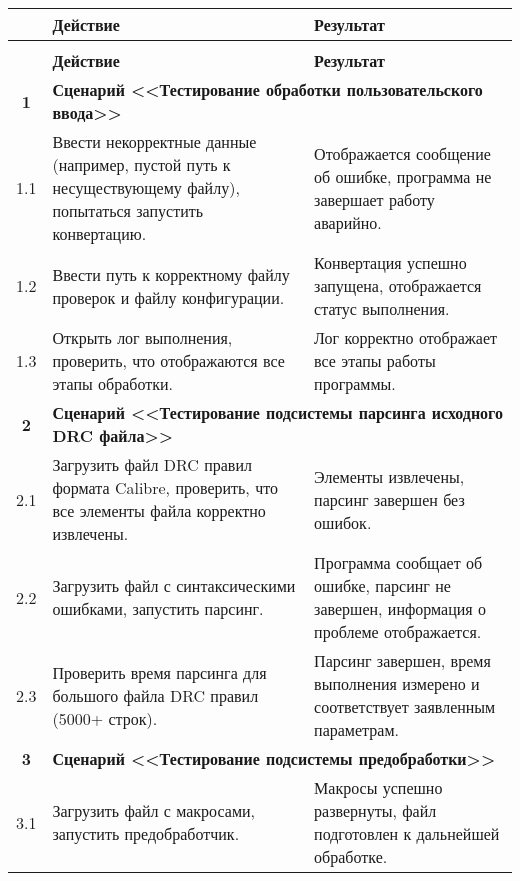 \begin{longtable}{|c|p{7.5cm}|p{7.5cm}|}
	\caption{} \label{table:test} \\
	\hline
	\textbf{\No} & \textbf{Действие} & \textbf{Результат} \\
	\hline
	\endfirsthead
	\conttable{table:test} \\
	\hline
	\textbf{\No} & \textbf{Действие} & \textbf{Результат} \\
	\hline
	\endhead

	\textbf{1}
	& \multicolumn{2}{|l|}{\textbf{
		Сценарий <<Тестирование обработки пользовательского ввода>>}} \\ \hline
	1.1
	& Ввести некорректные данные
	(например, пустой путь к несуществующему файлу),
	попытаться запустить конвертацию.
	& Отображается сообщение об ошибке,
	программа не завершает работу аварийно. \\ \hline

	1.2
	& Ввести путь к корректному файлу проверок и файлу конфигурации.
	& Конвертация успешно запущена, отображается статус выполнения. \\ \hline

	1.3
	& Открыть лог выполнения, проверить, что отображаются все этапы обработки.
	& Лог корректно отображает все этапы работы программы. \\ \hline

	\textbf{2}
	& \multicolumn{2}{|p{15cm}|}{\textbf{Сценарий
		<<Тестирование подсистемы парсинга исходного DRC файла>>}} \\ \hline
	2.1
	& Загрузить файл DRC правил формата Calibre,
	проверить, что все элементы файла корректно извлечены.
	& Элементы извлечены, парсинг завершен без ошибок. \\ \hline

	2.2
	& Загрузить файл с синтаксическими ошибками, запустить парсинг.
	& Программа сообщает об ошибке, парсинг не завершен,
	информация о проблеме отображается. \\ \hline

	2.3
	& Проверить время парсинга для большого файла DRC правил (5000+ строк).
	& Парсинг завершен, время выполнения измерено
	и соответствует заявленным параметрам. \\ \hline

	\textbf{3}
	& \multicolumn{2}{|l|}{\textbf{
		Сценарий <<Тестирование подсистемы предобработки>>}} \\ \hline
	3.1
	& Загрузить файл с макросами, запустить предобработчик.
	& Макросы успешно развернуты,
	файл подготовлен к дальнейшей обработке. \\ \hline


\end{longtable}
